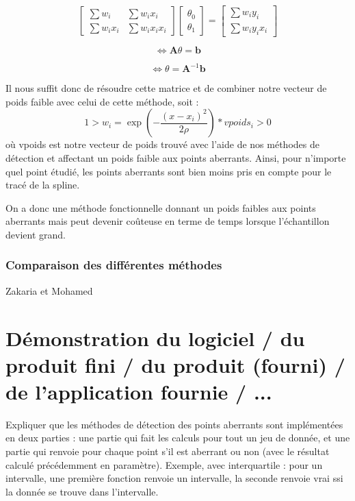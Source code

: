 \documentclass[a4paper,12pt]{article} %
\begin{document}
                    
                    
                        \[\begin{bmatrix} \sum w_i & \sum w_i x_i \\ \sum w_i x_i & \sum w_i x_i x_i \end{bmatrix}  \begin{bmatrix} \theta_0 \\ \theta_1 \end{bmatrix}   = \begin{bmatrix}  \sum w_i y_i \\  \sum w_i y_i x_i \end{bmatrix}\] 
                    
                        \[\iff \mathbf{A} \theta = \mathbf{b}\]
                    
                        \[\iff \theta = \mathbf{A}^{-1} \mathbf{b}\]
                    
                    Il nous suffit donc de résoudre cette matrice et de combiner notre vecteur de poids faible avec celui de cette méthode, soit :
                    \[1 > w_i = \exp \left( - \frac{(x -x_i)^2}{2 \rho} \right)*vpoids_i > 0\] 
                    où vpoids est notre vecteur de poids trouvé avec l'aide de nos méthodes de détection et affectant un poids faible aux points aberrants.
                    Ainsi, pour n'importe quel point étudié, les points aberrants sont bien moins pris en compte pour le tracé de la spline.
                    
                    
                    
                    On a donc une méthode fonctionnelle donnant un poids faibles aux points aberrants mais peut devenir coûteuse en terme de temps lorsque l'échantillon devient grand.

	\section{Comparaison des différentes méthodes}
        Zakaria et Mohamed

\renewcommand\partname{}
\part{Démonstration du logiciel / du produit fini / du produit (fourni) / de l'application fournie / ...}

Expliquer que les méthodes de détection des points aberrants sont implémentées en deux parties : une partie qui fait les calculs pour tout un jeu de donnée, et une partie qui renvoie pour chaque point s'il est aberrant ou non (avec le résultat calculé précédemment en paramètre). Exemple, avec interquartile : pour un intervalle, une première fonction renvoie un intervalle, la seconde renvoie vrai ssi la donnée se trouve dans l'intervalle. 
\end{document}
